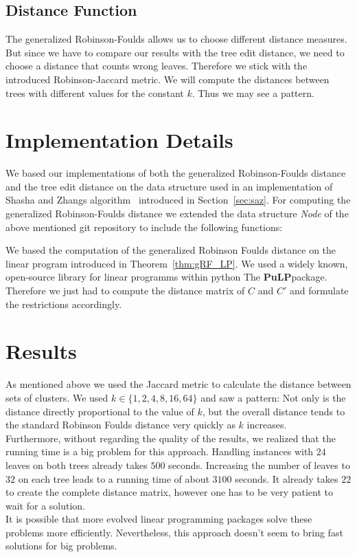 \subsection{Distance Function}
The generalized Robinson-Foulds allows us to choose different distance measures. But since we have to compare our results with the tree edit distance, we need to choose a distance that counts wrong leaves. Therefore we stick with the introduced Robinson-Jaccard metric. We will compute the distances between trees with different values for the constant $k$. Thus we may see a pattern.

\section{Implementation Details}
We based our implementations of both the generalized Robinson-Foulds distance and the tree edit distance on the data structure used in an implementation of Shasha and Zhangs algorithm~\cite{Hen} introduced in Section~\ref{sec:saz}. For computing the generalized Robinson-Foulds distance we extended the data structure \textit{Node} of the above mentioned git repository to include the following functions:

We based the computation of the generalized Robinson Foulds distance on the linear program introduced in Theorem~\ref{thm:gRF_LP}. We used a widely known, open-source library for linear programms within python The \textbf{PuLP}package. Therefore we just had to compute the distance matrix of $C$ and $C'$ and formulate the restrictions accordingly. 

\section{Results}
As mentioned above we used the Jaccard metric to calculate the distance between sets of clusters. We used $k \in \{1,2,4,8,16,64\}$ and saw a pattern: Not only is the distance directly proportional to the value of $k$, but the overall distance tends to the standard Robinson Foulds distance very quickly as $k$ increases. \\
Furthermore, without regarding the quality of the results, we realized that the running time is a big problem for this approach. Handling instances with $24$ leaves on both trees already takes $500$ seconds. Increasing the number of leaves to $32$ on each tree leads to a running time of about $3100$ seconds. It already takes $22$ to create the complete distance matrix, however one has to be very patient to wait for a solution.\\
It is possible that more evolved linear programming packages solve these problems more efficiently. Nevertheless, this approach doesn't seem to bring fast solutions for big problems.
